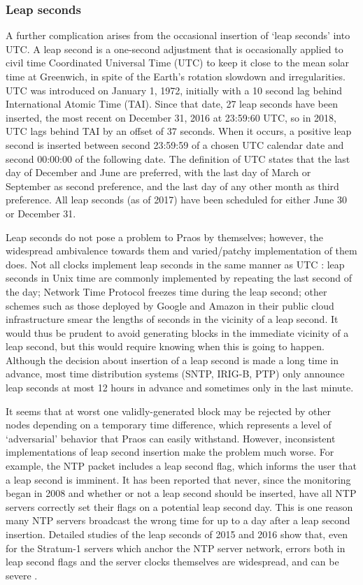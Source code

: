 \documentclass[11pt,a4paper]{article}
\begin{document}
\subsubsection{Leap seconds}
\label{leap-seconds}

A further complication arises from the occasional insertion of `leap
seconds' into UTC. A leap second is a one-second adjustment that is
occasionally applied to civil time Coordinated Universal Time (UTC) to
keep it close to the mean solar time at Greenwich, in spite of the
Earth's rotation slowdown and irregularities. UTC was introduced on
January 1, 1972, initially with a 10 second lag behind International
Atomic Time (TAI). Since that date, 27 leap seconds have been inserted,
the most recent on December 31, 2016 at 23:59:60 UTC, so in 2018, UTC
lags behind TAI by an offset of 37 seconds. When it occurs, a positive
leap second is inserted between second 23:59:59 of a chosen UTC calendar
date and second 00:00:00 of the following date. The definition of UTC
states that the last day of December and June are preferred, with the
last day of March or September as second preference, and the last day of
any other month as third preference. All leap seconds (as of 2017) have
been scheduled for either June 30 or December 31.

Leap seconds do not pose a problem to Praos by themselves; however, the
widespread ambivalence towards them and varied/patchy implementation of
them does. Not all clocks implement leap seconds in the same manner as
UTC \cite{RFC7164}: leap seconds in Unix time are commonly implemented by
repeating the last second of the day; Network Time Protocol freezes time
during the leap second; other schemes such as those deployed by Google
and Amazon in their public cloud infrastructure smear the lengths of
seconds in the vicinity of a leap second. It would thus be prudent to
avoid generating blocks in the immediate vicinity of a leap second, but
this would require knowing when this is going to happen. Although the
decision about insertion of a leap second is made a long time in
advance, most time distribution systems (SNTP, IRIG-B, PTP) only
announce leap seconds at most 12 hours in advance and sometimes only in
the last minute.

It seems that at worst one validly-generated block may be rejected by
other nodes depending on a temporary time difference, which represents a
level of `adversarial' behavior that Praos can easily withstand.
However, inconsistent implementations of leap second insertion make the
problem much worse. For example, the NTP packet includes a leap second
flag, which informs the user that a leap second is imminent. It has been
reported \cite{Malone16} that never, since the monitoring began in 2008
and whether or not a leap second should be inserted, have all NTP
servers correctly set their flags on a potential leap second day. This
is one reason many NTP servers broadcast the wrong time for up to a day
after a leap second insertion. Detailed studies of the leap seconds of
2015 and 2016 show that, even for the Stratum-1 servers which anchor the
NTP server network, errors both in leap second flags and the server
clocks themselves are widespread, and can be severe \cite{CV18}.
\end{document}
